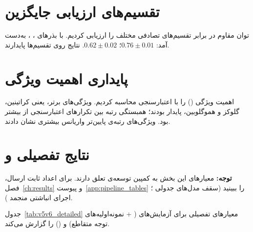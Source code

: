 \section{تقسیم‌های ارزیابی جایگزین}

توان مقاوم در برابر تقسیم‌های تصادفی مختلف را ارزیابی کردیم. با بذرهای ، ،  به‌دست آمد:  $0.76 \pm 0.01$؛  $0.62 \pm 0.02$. نتایج روی تقسیم‌ها پایدارند.

\section{پایداری اهمیت ویژگی}

اهمیت ویژگی () را با اعتبارسنجی  محاسبه کردیم. ویژگی‌های برتر، یعنی کراتینین، گلوکز و هموگلوبین، پایدار بودند؛ همبستگی رتبه بین تکرارهای اعتبارسنجی از  بیشتر بود. ویژگی‌های رتبه‌ی پایین‌تر واریانس بیشتری نشان دادند.

\section{نتایج تفصیلی  و }
\label{sec:v5v6_extended}

\noindent\textbf{توجه:} معیارهای این بخش به کمپین توسعه‌ی  تعلق دارند. برای اعداد ثابت ارسال، فصل~\ref{ch:results} و پیوست~\ref{app:pipeline_tables} را ببینید (سقف مدل‌های جدولی \textbf{}؛ اجرای انباشتی منجمد \textbf{}).

جدول~\ref{tab:v5v6_detailed} معیارهای تفصیلی برای آزمایش‌های  ( + نمونه‌اولیه‌های توجه متقاطع) و  () را گزارش می‌کند.


